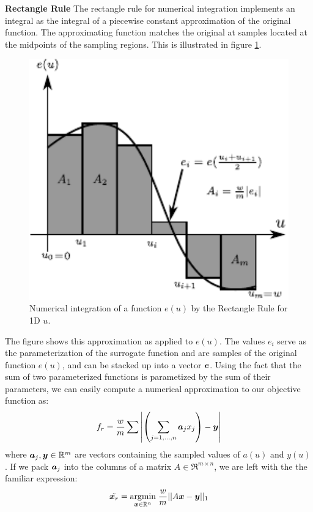 \documentclass[12pt,journal,draftcls,letterpaper,twocolumn]{IEEEtran}
\begin{document}
{\bf Rectangle Rule} The rectangle rule for numerical integration implements an
integral as the integral of a piecewise constant approximation of the original
function.  The approximating function matches the original at samples located
at the midpoints of the sampling regions. This is illustrated in figure
\ref{fig:rectangle}.
\begin{figure}
 \centering
 \includegraphics[width=5in]{integration_rectangle_midpoint.pdf}
 \caption{Numerical integration of a function $e(u)$ by the Rectangle Rule for 1D $u$.}
 \label{fig:rectangle}
\end{figure}
The figure shows this approximation as applied to $e(u)$. The values $e_i$ serve as the parameterization of the surrogate function and are samples of the original function $e(u)$, and can be stacked up into a vector $\boldsymbol{e}$.  Using the fact that the sum of two parameterized functions is parametized by the sum of their parameters, we can easily compute a numerical approximation to our objective function as:
\begin{equation}\label{eqn:discrete1DBox}
f_r = \frac{w}{m} \sum{ \left|\left(\sum_{j=1,\ldots,n} \boldsymbol{a}_j x_j\right) - {\boldsymbol{y}}\right|}
\end{equation}
where $\boldsymbol{a}_j, {\boldsymbol{y}} \in \mathbb R^m$ are vectors containing the sampled values of $a(u)$ and $y(u)$.  If we pack $\boldsymbol{a}_j$ into the columns of a matrix $A \in \Re^{m \times n}$, we are left with the the familiar expression:
\begin{equation}\label{eqn:original_optimization}
\tilde{{\boldsymbol{x}}_r} = {\hbox{$\underset{{\boldsymbol{x}}\in \mathbb R^n}{\mbox{argmin}}\;$}} \frac{w}{m} || A {\boldsymbol{x}} - {\boldsymbol{y}} ||_1
\end{equation}
\end{document}
